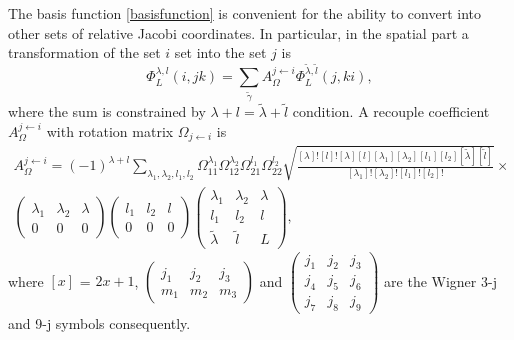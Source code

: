 \documentclass[
12pt, %
oneside, %
english, %
onehalfspacing, %
headsepline, %
]{MastersDoctoralThesis} %
\begin{document}
The basis function \eqref{basisfunction} is convenient for the ability to convert into other sets of relative Jacobi coordinates. In particular, in the spatial part a transformation of the  set $i$ set into the set $j$  is
\begin{equation}
\label{basistransfortmation}
\Phi^{\lambda,l}_L(i,jk)=\sum_{\widetilde{\gamma}} A_{\Omega}^{j \leftarrow i}  \Phi^{\widetilde{\lambda},\widetilde{l}}_L(j,ki),
\end{equation}
where the sum is constrained by $\lambda+l=\widetilde{\lambda}+\widetilde{l}$  condition. A recouple coefficient $A_{\Omega}^{j \leftarrow i}$ with rotation matrix $\Omega_{j \leftarrow i}$ is
\begin{equation}
\begin{gathered}
 A_{\Omega}^{j \leftarrow i} =(-1)^{\lambda+l}  \sum_{\lambda_1, \lambda_2, l_1, l_2}
  \Omega^{\lambda_1}_{11}
  \Omega^{\lambda_2}_{12}
   \Omega^{l_1}_{21}
    \Omega^{l_2}_{22}
   \sqrt{\frac{ [\lambda]! [l]! [\lambda] [l] [\lambda_1] [\lambda_2] [l_1] [l_2] [\widetilde{\lambda}] [\widetilde{l}]  }{   [\lambda_1]!   [\lambda_2]! [l_1]!  [l_2]!  }       }  \times\\
 \begin{pmatrix}
 \lambda_1 & \lambda_2 & {\lambda} \\ 
 0 & 0 & 0
 \end{pmatrix} 
 \begin{pmatrix}
 l_1 & l_2 & {l} \\ 
 0 & 0 & 0
 \end{pmatrix} 
 \begin{pmatrix}
 \lambda_1 & \lambda_2 & \lambda \\ 
 l_1 & l_2 & l \\ 
 \widetilde{\lambda} & \widetilde{l} & L
 \end{pmatrix} ,
 \end{gathered}
\end{equation}
where $[x]$ = $2x+1$, $ \begin{pmatrix}
 j_1 & j_2 & j_3 \\ 
 m_1 & m_2 & m_3
 \end{pmatrix}  $ and $\begin{pmatrix}
 j_1 & j_2 & j_3 \\ 
 j_4 & j_5 & j_6 \\ 
 j_7 & j_8 & j_9
 \end{pmatrix} $ are the Wigner 3-j and 9-j symbols consequently. \\
\end{document}
